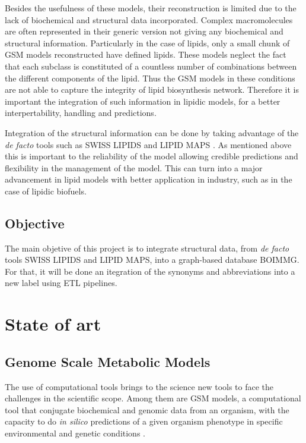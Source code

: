 \documentclass{llncs}
\begin{document}
Besides the usefulness of these models, their reconstruction is limited due to the lack of biochemical and structural data incorporated.
Complex macromolecules are often represented in their generic version not giving any biochemical and structural information.
Particularly in the case of lipids\cite{Aung2013}, only a small chunk of GSM models reconstructed have defined lipids. 
These models neglect the fact that each subclass is constituted of a countless number of combinations between the different components of the lipid. 
Thus the GSM models in these conditions are not able to capture the integrity of lipid biosynthesis network.
Therefore it is important the integration of such information in lipidic models, for a better interpertability, handling and predictions.

Integration of the structural information can be done by taking advantage of the  \emph{de facto} tools such as SWISS LIPIDS \cite{Aimo2015} and  LIPID MAPS \cite{Sud2007}.
As mentioned above this is important to the reliability of the model allowing credible predictions and flexibility in the management of the model.
This can turn into a major advancement in lipid models with better application in industry, such as in the case of lipidic biofuels.




\subsection{Objective}

The main objetive of this project is to integrate structural data, from \emph{de facto} tools SWISS LIPIDS and LIPID MAPS, into a graph-based database BOIMMG.
For that, it will be done an itegration of the synonyms and abbreviations into a new label using ETL pipelines. 

\section{State of art}
\subsection{Genome Scale Metabolic Models}
The use of computational tools brings to the science new tools to face the challenges in the scientific scope.
Among them are GSM models, a computational tool that conjugate biochemical and genomic data from an organism, with the capacity to do \emph{in silico} predictions of a given organism phenotype in specific environmental and genetic conditions \cite{Rocha2007,Zhou2021}.
\end{document}
